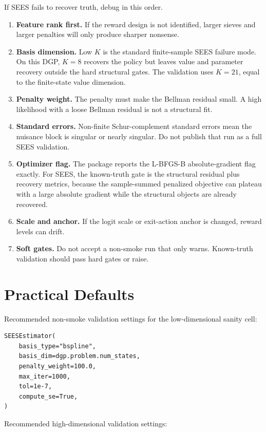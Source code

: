 \documentclass[10pt]{article}
\begin{document}
If SEES fails to recover truth, debug in this order.

\begin{enumerate}
\item \textbf{Feature rank first.} If the reward design is not identified,
larger sieves and larger penalties will only produce sharper nonsense.
\item \textbf{Basis dimension.} Low \(K\) is the standard finite-sample SEES
failure mode. On this DGP, \(K=8\) recovers the policy but leaves value and
parameter recovery outside the hard structural gates. The validation uses
\(K=21\), equal to the finite-state value dimension.
\item \textbf{Penalty weight.} The penalty must make the Bellman residual
small. A high likelihood with a loose Bellman residual is not a structural
fit.
\item \textbf{Standard errors.} Non-finite Schur-complement standard errors
mean the nuisance block is singular or nearly singular. Do not publish that
run as a full SEES validation.
\item \textbf{Optimizer flag.} The package reports the L-BFGS-B
absolute-gradient flag exactly. For SEES, the known-truth gate is the
structural residual plus recovery metrics, because the sample-summed
penalized objective can plateau with a large absolute gradient while the
structural objects are already recovered.
\item \textbf{Scale and anchor.} If the logit scale or exit-action anchor is
changed, reward levels can drift.
\item \textbf{Soft gates.} Do not accept a non-smoke run that only warns.
Known-truth validation should pass hard gates or raise.
\end{enumerate}

\section{Practical Defaults}

Recommended non-smoke validation settings for the low-dimensional sanity cell:

\begin{lstlisting}
SEESEstimator(
    basis_type="bspline",
    basis_dim=dgp.problem.num_states,
    penalty_weight=100.0,
    max_iter=1000,
    tol=1e-7,
    compute_se=True,
)
\end{lstlisting}

Recommended high-dimensional validation settings:
\end{document}
